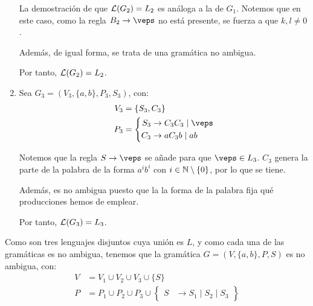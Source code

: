 \begin{ejercicio}
\begin{enumerate}
        La demostración de que $\mathcal{L}(G_2)=L_2$ es análoga a la de $G_1$. Notemos que en este caso, como la regla $B_2\rightarrow \veps$ no está presente, se fuerza a que $k,l\neq 0$.

        Además, de igual forma, se trata de una gramática no ambigua.

        Por tanto, $\mathcal{L}(G_2)=L_2$.

        \item Sea $G_3=(V_3,\{a,b\},P_3,S_3)$, con:
        \begin{equation*}
            \begin{aligned}
                V_3 &= \{ S_3, C_3\} \\
                P_3 &= \left\{
                    \begin{aligned}
                        S_3 &\rightarrow C_3C_3 \mid \veps \\
                        C_3 &\rightarrow aC_3b \mid ab
                    \end{aligned}
                \right.
            \end{aligned}
        \end{equation*}

        Notemos que la regla $S\rightarrow \veps$ se añade para que $\veps\in L_3$. $C_3$ genera la parte de la palabra de la forma $a^ib^i$ con $i\in \mathbb{N}\setminus \{0\}$, por lo que se tiene.

        Además, es no ambigua puesto que la la forma de la palabra fija qué producciones hemos de emplear.

        Por tanto, $\mathcal{L}(G_3)=L_3$.        
    \end{enumerate}

    Como son tres lenguajes disjuntos cuya unión es $L$, y como cada una de las gramáticas es no ambigua, tenemos que la gramática $G=(V,\{a,b\},P,S)$ es no ambigua, con:
    \begin{equation*}
        \begin{aligned}
            V &= V_1\cup V_2\cup V_3\cup \{ S \} \\
            P &= P_1\cup P_2\cup P_3\cup \left\{
                \begin{aligned}
                    S &\rightarrow S_1 \mid S_2 \mid S_3
                \end{aligned}
            \right\}
        \end{aligned}
    \end{equation*}
\end{ejercicio}

